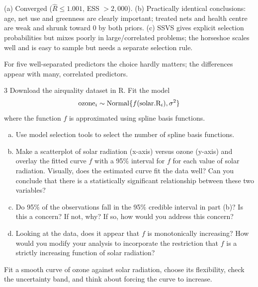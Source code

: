 \documentclass[11pt]{article}
\begin{document}
\begin{answer}
(a) Converged ($\hat R\le1.001$, ESS $>2{,}000$). (b) Practically identical conclusions: age, net use and greenness are clearly important; treated nets and health centre are weak and shrunk toward 0 by both priors. (c) SSVS gives explicit selection probabilities but mixes poorly in large/correlated problems; the horseshoe scales well and is easy to sample but needs a separate selection rule.
\end{answer}

\begin{takeaway}
For five well-separated predictors the choice hardly matters; the differences appear with many, correlated predictors.
\end{takeaway}


\begin{problem}{3}
Download the airquality dataset in R. Fit the model
\[
\text{ozone}_i\sim\mathrm{Normal}\{f(\text{solar.R}_i),\sigma^2\}
\]
where the function $f$ is approximated using spline basis functions.
\begin{enumerate}[(a)]
\item Use model selection tools to select the number of spline basis functions.
\item Make a scatterplot of solar radiation (x-axis) versus ozone (y-axis) and overlay the fitted curve $f$ with a 95\% interval for $f$ for each value of solar radiation. Visually, does the estimated curve fit the data well? Can you conclude that there is a statistically significant relationship between these two variables?
\item Do 95\% of the observations fall in the 95\% credible interval in part (b)? Is this a concern? If not, why? If so, how would you address this concern?
\item Looking at the data, does it appear that $f$ is monotonically increasing? How would you modify your analysis to incorporate the restriction that $f$ is a strictly increasing function of solar radiation?
\end{enumerate}
\end{problem}

\begin{restate}
Fit a smooth curve of ozone against solar radiation, choose its flexibility, check the uncertainty band, and think about forcing the curve to increase.
\end{restate}
\end{document}
